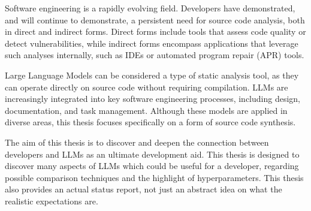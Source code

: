 Software engineering is a rapidly evolving field.
Developers have demonstrated, and will continue to demonstrate, a persistent need for source code analysis, both in direct and indirect forms.
Direct forms include tools that assess code quality or detect vulnerabilities, while indirect forms encompass applications that leverage such analyses internally, such as IDEs or automated program repair (APR) tools.

Large Language Models can be considered a type of static analysis tool, as they can operate directly on source code without requiring compilation.
LLMs are increasingly integrated into key software engineering processes, including design, documentation, and task management.
Although these models are applied in diverse areas, this thesis focuses specifically on a form of source code synthesis.

The aim of this thesis is to discover and deepen the connection between developers and LLMs as an ultimate development aid.
This thesis is designed to discover many aspects of LLMs which could be useful for a developer, regarding possible comparison techniques and the highlight of hyperparameters.
This thesis also provides an actual status report, not just an abstract idea on what the realistic expectations are.
